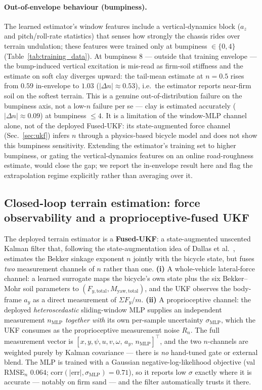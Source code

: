 \documentclass[conference,letterpaper,10pt]{IEEEtran}
\begin{document}
\paragraph{Out-of-envelope behaviour (bumpiness).}
The learned estimator's window features include a vertical-dynamics
block ($a_z$ and pitch/roll-rate statistics) that senses how strongly
the chassis rides over terrain undulation; these features were trained
only at bumpiness $\in\{0,4\}$ (Table~\ref{tab:training_data}). At
bumpiness $8$ --- outside that training envelope --- the bump-induced
vertical excitation is mis-read as firm-soil stiffness and the estimate
on soft clay diverges upward: the tail-mean estimate at $n=0.5$ rises
from $0.59$ in-envelope to $1.03$ ($|\Delta n|\!\approx\!0.53$), i.e.\
the estimator reports near-firm soil on the softest terrain. This is a
genuine out-of-distribution failure on the bumpiness axis, not a
low-$n$ failure per se --- clay is estimated accurately
($|\Delta n|\!\approx\!0.09$) at bumpiness $\le 4$. It is a limitation
of the window-MLP channel alone, not of the deployed Fused-UKF: its
state-augmented force channel (Sec.~\ref{sec:ukf}) infers $n$ through a
physics-based bicycle model and does not show this bumpiness sensitivity. Extending the
estimator's training set to higher bumpiness, or gating the
vertical-dynamics features on an online road-roughness estimate, would
close the gap; we report the in-envelope result here and flag the
extrapolation regime explicitly rather than averaging over it.

\subsection{Closed-loop terrain estimation: force observability and a proprioceptive-fused UKF}
\label{sec:estimator_ukf}
\label{sec:ukf}

The deployed terrain estimator is a \textbf{Fused-UKF}: a
state-augmented unscented Kalman filter that, following the
state-augmentation idea of Dallas et al.~\cite{Dallas21}, estimates
the Bekker sinkage exponent $n$ jointly with the bicycle state, but
fuses \emph{two} measurement channels of $n$ rather than one.
\textbf{(i)} A whole-vehicle lateral-force channel: a learned surrogate
maps the bicycle's own state plus the six Bekker--Mohr soil parameters
to $(F_{y,\mathrm{total}}, M_{\mathrm{yaw,total}})$, and the UKF
observes the body-frame $a_y$ as a direct measurement of
$\Sigma F_y/m$. \textbf{(ii)} A proprioceptive channel: the deployed
\emph{heteroscedastic} sliding-window MLP supplies an independent
measurement $n_{\mathrm{MLP}}$ \emph{together with} its own per-sample
uncertainty $\sigma_{\mathrm{MLP}}$, which the UKF consumes as the
proprioceptive measurement noise $R_n$. The full measurement vector is
$[x,y,\psi,u,v,\omega,\,a_y,\,n_{\mathrm{MLP}}]^\top$, and the two
$n$-channels are weighted purely by Kalman covariance --- there is
\emph{no} hand-tuned gate or external blend. The MLP is trained with a
Gaussian negative-log-likelihood objective (val RMSE$_n$ $0.064$;
$\mathrm{corr}(|\mathrm{err}|,\sigma_{\mathrm{MLP}})\!=\!0.71$), so it
reports low $\sigma$ exactly where it is accurate --- notably on firm
sand --- and the filter automatically trusts it there.
\end{document}
